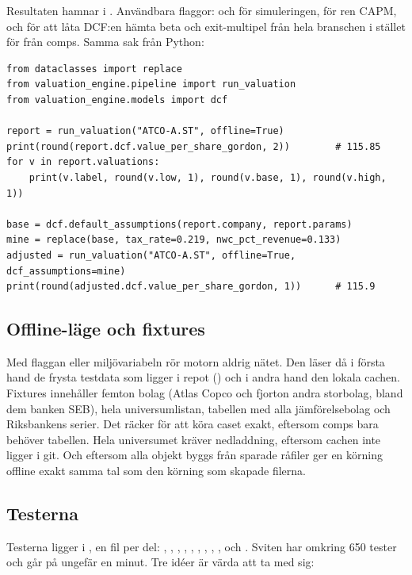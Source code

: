 Resultaten hamnar i . Användbara flaggor:  och
 för simuleringen,  för ren CAPM, och 
för att låta DCF:en hämta beta och exit-multipel från hela branschen i stället för från comps.
Samma sak från Python:

\begin{lstlisting}[caption={Motorn som bibliotek: basfallet, och caset med två ändrade
antaganden.},label=lst:api]
from dataclasses import replace
from valuation_engine.pipeline import run_valuation
from valuation_engine.models import dcf

report = run_valuation("ATCO-A.ST", offline=True)
print(round(report.dcf.value_per_share_gordon, 2))        # 115.85
for v in report.valuations:
    print(v.label, round(v.low, 1), round(v.base, 1), round(v.high, 1))

base = dcf.default_assumptions(report.company, report.params)
mine = replace(base, tax_rate=0.219, nwc_pct_revenue=0.133)
adjusted = run_valuation("ATCO-A.ST", offline=True, dcf_assumptions=mine)
print(round(adjusted.dcf.value_per_share_gordon, 1))      # 115.9
\end{lstlisting}

\subsection{Offline-läge och fixtures}

Med flaggan  eller miljövariabeln  rör motorn
aldrig nätet. Den läser då i första hand de frysta testdata som ligger i repot
() och i andra hand den lokala cachen. Fixtures innehåller femton bolag
(Atlas Copco och fjorton andra storbolag, bland dem banken SEB), hela universumlistan, tabellen
med alla jämförelsebolag och Riksbankens serier. Det räcker för att köra caset exakt, eftersom
comps bara behöver tabellen. Hela universumet kräver nedladdning, eftersom cachen inte ligger
i git. Och eftersom alla objekt byggs från sparade råfiler ger en körning offline exakt samma
tal som den körning som skapade filerna.

\subsection{Testerna}

Testerna ligger i , en fil per del: , ,
, , , , ,
, ,  och . Sviten har
omkring 650 tester och går på ungefär en minut. Tre idéer är värda att ta med sig:

